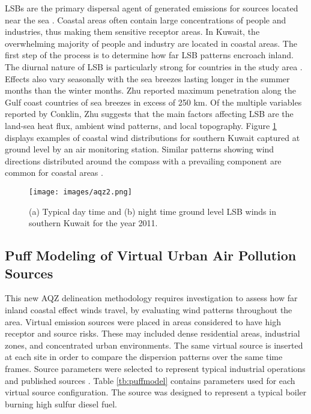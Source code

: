 LSBs are the primary dispersal agent of generated emissions for sources located near the sea \citep{Cuxart2014}.  Coastal areas often contain large concentrations of people and industries, thus making them sensitive receptor areas.  In Kuwait, the overwhelming majority of people and industry are located in coastal areas.  The first step of the process is to determine how far LSB patterns encroach inland.  The diurnal nature of LSB is particularly strong for countries in the study area \citep{Zhu2004}.  Effects also vary seasonally with the sea breezes lasting longer in the summer months than the winter months.  Zhu reported maximum penetration along the Gulf coast countries of sea breezes in excess of 250 km.  Of the multiple variables reported by Conklin, Zhu suggests that the main factors affecting LSB are the land-sea heat flux, ambient wind patterns, and local topography.  Figure \ref{fig:LSBwinds} displays examples of coastal wind distributions for southern Kuwait captured at ground level by an air monitoring station.  Similar patterns showing wind directions distributed around the compass with a prevailing component are common for coastal areas \citep{Lozano2013}.

%
\begin{figure}[H]
\texttt{[image: images/aqz2.png]} 
\caption[Typical LSB winds for Kuwait]{(a) Typical day time and (b) night time ground level LSB winds in southern Kuwait for the year 2011.}
\label{fig:LSBwinds}
\end{figure}
% 
\subsection{Puff Modeling of Virtual Urban Air Pollution Sources}

This new AQZ delineation methodology requires investigation to assess how far inland coastal effect winds travel, by evaluating wind patterns throughout the area.  Virtual emission sources were placed in areas considered to have high receptor and source risks.  These may included dense residential areas, industrial zones, and concentrated urban environments.  The same virtual source is inserted at each site in order to compare the dispersion patterns over the same time frames. Source parameters were selected to represent typical industrial operations and published sources \citep{Chusai2012}. Table \ref{tb:puffmodel} contains parameters used for each virtual source configuration.  The source was designed to represent a typical boiler burning high sulfur diesel fuel.

